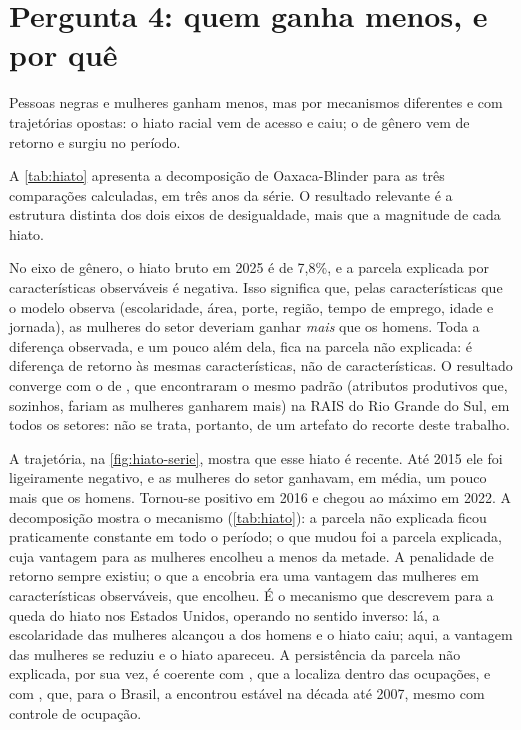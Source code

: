 \section{Pergunta 4: quem ganha menos, e por quê}
\label{sec:resultado-q4}

Pessoas negras e mulheres ganham menos, mas por mecanismos diferentes e com trajetórias opostas: o hiato racial vem de acesso e caiu; o de gênero vem de retorno e surgiu no período.



A \autoref{tab:hiato} apresenta a decomposição de Oaxaca-Blinder para as três comparações calculadas, em três anos da série. O resultado relevante é a estrutura distinta dos dois eixos de desigualdade, mais que a magnitude de cada hiato.

No eixo de gênero, o hiato bruto em 2025 é de 7,8\%, e a parcela explicada por características observáveis é negativa. Isso significa que, pelas características que o modelo observa (escolaridade, área, porte, região, tempo de emprego, idade e jornada), as mulheres do setor deveriam ganhar \textit{mais} que os homens. Toda a diferença observada, e um pouco além dela, fica na parcela não explicada: é diferença de retorno às mesmas características, não de características. O resultado converge com o de , que encontraram o mesmo padrão (atributos produtivos que, sozinhos, fariam as mulheres ganharem mais) na RAIS do Rio Grande do Sul, em todos os setores: não se trata, portanto, de um artefato do recorte deste trabalho.



A trajetória, na \autoref{fig:hiato-serie}, mostra que esse hiato é recente. Até 2015 ele foi ligeiramente negativo, e as mulheres do setor ganhavam, em média, um pouco mais que os homens. Tornou-se positivo em 2016 e chegou ao máximo em 2022. A decomposição mostra o mecanismo (\autoref{tab:hiato}): a parcela não explicada ficou praticamente constante em todo o período; o que mudou foi a parcela explicada, cuja vantagem para as mulheres encolheu a menos da metade. A penalidade de retorno sempre existiu; o que a encobria era uma vantagem das mulheres em características observáveis, que encolheu. É o mecanismo que  descrevem para a queda do hiato nos Estados Unidos, operando no sentido inverso: lá, a escolaridade das mulheres alcançou a dos homens e o hiato caiu; aqui, a vantagem das mulheres se reduziu e o hiato apareceu. A persistência da parcela não explicada, por sua vez, é coerente com , que a localiza dentro das ocupações, e com , que, para o Brasil, a encontrou estável na década até 2007, mesmo com controle de ocupação.

